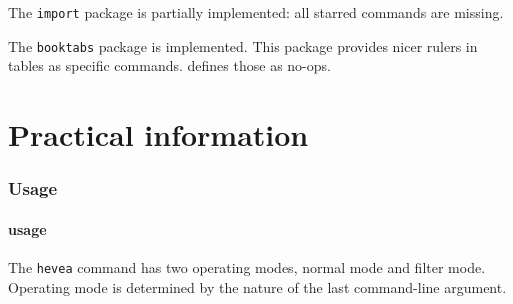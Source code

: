 The \texttt{import} package is partially implemented:
all starred commands are missing.

The \texttt{booktabs} package is implemented.
This package provides nicer rulers in tables as specific commands.
\hevea{} defines those as no-ops.




\cutend
\setcounter{section}{0}

\part{Practical \label{practical}information}

\section{Usage}
\subsection{\hevea{} usage}\label{heveausage}
The \texttt{hevea} command has two operating modes, normal mode and
filter mode.
Operating mode is determined by the nature of the last command-line
argument.

